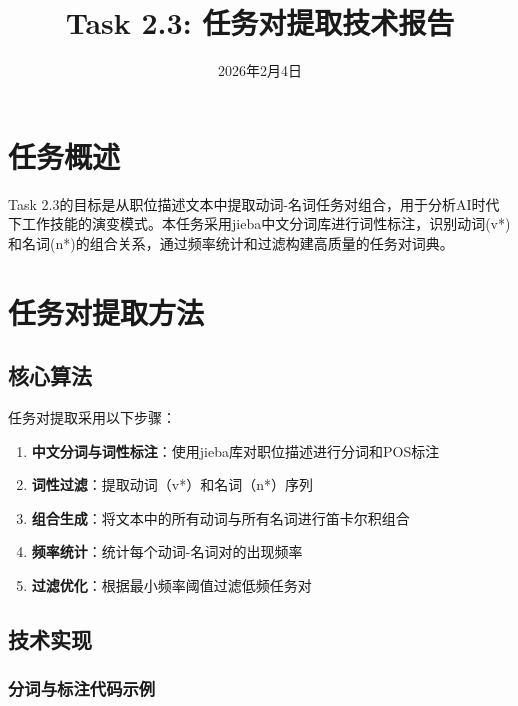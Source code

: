 \documentclass[11pt,a4paper]{article}
\title{\textbf{Task 2.3: 任务对提取技术报告}}
\date{2026年2月4日}
\begin{document}
\maketitle

\section{任务概述}

Task 2.3的目标是从职位描述文本中提取动词-名词任务对组合，用于分析AI时代下工作技能的演变模式。本任务采用jieba中文分词库进行词性标注，识别动词(v*)和名词(n*)的组合关系，通过频率统计和过滤构建高质量的任务对词典。

\section{任务对提取方法}

\subsection{核心算法}

任务对提取采用以下步骤：

\begin{enumerate}
    \item \textbf{中文分词与词性标注}：使用jieba库对职位描述进行分词和POS标注
    \item \textbf{词性过滤}：提取动词（v*）和名词（n*）序列
    \item \textbf{组合生成}：将文本中的所有动词与所有名词进行笛卡尔积组合
    \item \textbf{频率统计}：统计每个动词-名词对的出现频率
    \item \textbf{过滤优化}：根据最小频率阈值过滤低频任务对
\end{enumerate}

\subsection{技术实现}

\subsubsection{分词与标注代码示例}
\end{document}
